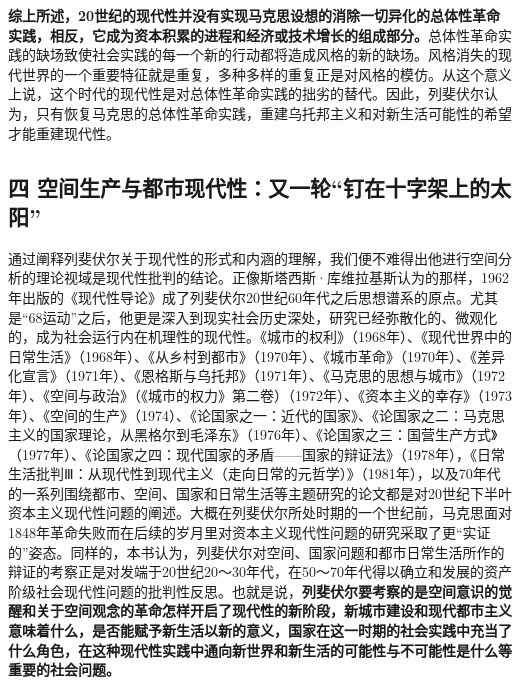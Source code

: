 \documentclass[UTF8, fontset = sourcesans, a4paper, oneside, zihao =
-4, scheme=chinese, no-math, space=true]{ctexbook}
\begin{document}
\textbf{综上所述，20世纪的现代性并没有实现马克思设想的消除一切异化的总体性革命实践，相反，它成为资本积累的进程和经济或技术增长的组成部分。}总体性革命实践的缺场致使社会实践的每一个新的行动都将造成风格的新的缺场。风格消失的现代世界的一个重要特征就是重复，多种多样的重复正是对风格的模仿。从这个意义上说，这个时代的现代性是对总体性革命实践的拙劣的替代。因此，列斐伏尔认为，只有恢复马克思的总体性革命实践，重建乌托邦主义和对新生活可能性的希望才能重建现代性。

\subsection{\texorpdfstring{四
空间生产与都市现代性：又一轮``钉在十字架上的太阳''}{四 空间生产与都市现代性：又一轮钉在十字架上的太阳}}\label{part0005_split_002.htmlux5cux23c009}

通过阐释列斐伏尔关于现代性的形式和内涵的理解，我们便不难得出他进行空间分析的理论视域是现代性批判的结论。正像斯塔西斯·库维拉基斯认为的那样，1962年出版的《现代性导论》成了列斐伏尔20世纪60年代之后思想谱系的原点。尤其是``68运动''之后，他更是深入到现实社会历史深处，研究已经弥散化的、微观化的，成为社会运行内在机理性的现代性。《城市的权利》（1968年）、《现代世界中的日常生活》（1968年）、《从乡村到都市》（1970年）、《城市革命》（1970年）、《差异化宣言》（1971年）、《恩格斯与乌托邦》（1971年）、《马克思的思想与城市》（1972年）、《空间与政治》（《城市的权力》第二卷）（1972年）、《资本主义的幸存》（1973年）、《空间的生产》（1974）、《论国家之一：近代的国家》、《论国家之二：马克思主义的国家理论，从黑格尔到毛泽东》（1976年）、《论国家之三：国营生产方式》（1977年）、《论国家之四：现代国家的矛盾------国家的辩证法》（1978年），《日常生活批判Ⅲ：从现代性到现代主义（走向日常的元哲学）》（1981年），以及70年代的一系列围绕都市、空间、国家和日常生活等主题研究的论文都是对20世纪下半叶资本主义现代性问题的阐述。大概在列斐伏尔所处时期的一个世纪前，马克思面对1848年革命失败而在后续的岁月里对资本主义现代性问题的研究采取了更``实证的''姿态。同样的，本书认为，列斐伏尔对空间、国家问题和都市日常生活所作的辩证的考察正是对发端于20世纪20～30年代，在50～70年代得以确立和发展的资产阶级社会现代性问题的批判性反思。也就是说，\textbf{列斐伏尔要考察的是空间意识的觉醒和关于空间观念的革命怎样开启了现代性的新阶段，新城市建设和现代都市主义意味着什么，是否能赋予新生活以新的意义，国家在这一时期的社会实践中充当了什么角色，在这种现代性实践中通向新世界和新生活的可能性与不可能性是什么等重要的社会问题。}
\end{document}
